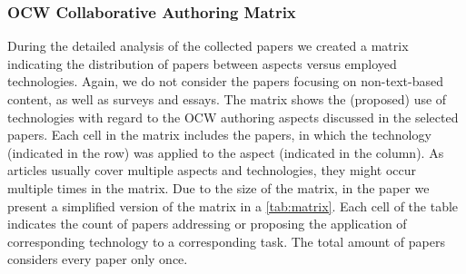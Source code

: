 \documentclass[ngerman,UKenglish,table]{scrbook}
\begin{document}
\subsubsection{OCW Collaborative Authoring Matrix}
\label{sec:matrix}

During the detailed analysis of the collected papers we created a matrix indicating the distribution of papers between aspects versus employed technologies.
Again, we do not consider the papers focusing on non-text-based content, as well as surveys and essays. 
The matrix shows the (proposed) use of technologies with regard to the OCW authoring aspects discussed in the selected papers.
Each cell in the matrix includes the papers, in which the technology (indicated in the row) was applied to the aspect (indicated in the column).
As articles usually cover multiple aspects and technologies, they might occur multiple times in the matrix.
Due to the size of the matrix, in the paper we present a simplified version of the matrix in a \autoref{tab:matrix}.
Each cell of the table indicates the count of papers addressing or proposing the application of corresponding technology to a corresponding task.
The total amount of papers considers every paper only once. 
\end{document}
